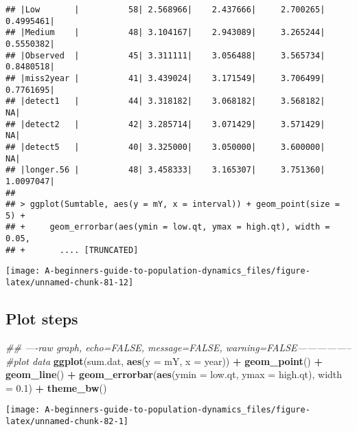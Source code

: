 \documentclass[]{book}
\newenvironment{Shaded}{\begin{snugshade}}{\end{snugshade}}
\newcommand{\CommentTok}[1]{\textcolor[rgb]{0.56,0.35,0.01}{\textit{#1}}}
\newcommand{\DataTypeTok}[1]{\textcolor[rgb]{0.13,0.29,0.53}{#1}}
\newcommand{\FloatTok}[1]{\textcolor[rgb]{0.00,0.00,0.81}{#1}}
\newcommand{\KeywordTok}[1]{\textcolor[rgb]{0.13,0.29,0.53}{\textbf{#1}}}
\newcommand{\NormalTok}[1]{#1}
\newcommand{\OperatorTok}[1]{\textcolor[rgb]{0.81,0.36,0.00}{\textbf{#1}}}
\newcommand{\StringTok}[1]{\textcolor[rgb]{0.31,0.60,0.02}{#1}}
\begin{document}
\begin{verbatim}
## |Low       |          58| 2.568966|    2.437666|     2.700265| 0.4995461|
## |Medium    |          48| 3.104167|    2.943089|     3.265244| 0.5550382|
## |Observed  |          45| 3.311111|    3.056488|     3.565734| 0.8480518|
## |miss2year |          41| 3.439024|    3.171549|     3.706499| 0.7761695|
## |detect1   |          44| 3.318182|    3.068182|     3.568182|        NA|
## |detect2   |          42| 3.285714|    3.071429|     3.571429|        NA|
## |detect5   |          40| 3.325000|    3.050000|     3.600000|        NA|
## |longer.56 |          48| 3.458333|    3.165307|     3.751360| 1.0097047|
## 
## > ggplot(Sumtable, aes(y = mY, x = interval)) + geom_point(size = 5) + 
## +     geom_errorbar(aes(ymin = low.qt, ymax = high.qt), width = 0.05, 
## +       .... [TRUNCATED]
\end{verbatim}

\begin{center}\texttt{[image: A-beginners-guide-to-population-dynamics\_files/figure-latex/unnamed-chunk-81-12]} \end{center}

\hypertarget{plot-steps-1}{%
\subsection{Plot steps}\label{plot-steps-1}}

\begin{Shaded}
\begin{Highlighting}[]
\CommentTok{## ----raw graph, echo=FALSE, message=FALSE, warning=FALSE-----------------}
\CommentTok{#plot data}
\KeywordTok{ggplot}\NormalTok{(sum.dat, }\KeywordTok{aes}\NormalTok{(}\DataTypeTok{y =}\NormalTok{ mY, }\DataTypeTok{x =}\NormalTok{ year)) }\OperatorTok{+}
\StringTok{  }\KeywordTok{geom_point}\NormalTok{() }\OperatorTok{+}
\StringTok{  }\KeywordTok{geom_line}\NormalTok{() }\OperatorTok{+}
\StringTok{  }\KeywordTok{geom_errorbar}\NormalTok{(}\KeywordTok{aes}\NormalTok{(}\DataTypeTok{ymin =}\NormalTok{ low.qt, }\DataTypeTok{ymax =}\NormalTok{ high.qt), }\DataTypeTok{width =} \FloatTok{0.1}\NormalTok{) }\OperatorTok{+}
\StringTok{  }\KeywordTok{theme_bw}\NormalTok{()}
\end{Highlighting}
\end{Shaded}

\begin{center}\texttt{[image: A-beginners-guide-to-population-dynamics\_files/figure-latex/unnamed-chunk-82-1]} \end{center}
\end{document}
